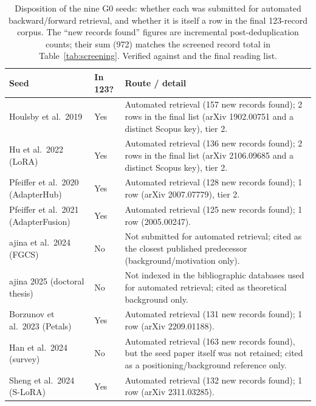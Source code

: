 \begin{table}[H]
\centering
\caption{Disposition of the nine G0 seeds: whether each was submitted for
automated backward/forward retrieval, and whether it is itself a row in the
final 123-record corpus. The ``new records found'' figures are incremental
post-deduplication counts; their sum (972) matches the screened record total in
Table~\ref{tab:screening}. Verified against \texttt{}
and the final reading list.}
\label{tab:g0_disposition}
\small
\setlength{\tabcolsep}{4pt}
\begin{tabular}{
  >{\raggedright\arraybackslash}p{}
  >{\raggedright\arraybackslash}p{}
  >{\raggedright\arraybackslash}p{}}
\toprule
\textbf{Seed} & \textbf{In 123?} & \textbf{Route / detail} \\
\midrule
Houlsby et al.\ 2019 & Yes & Automated retrieval (157 new records found); 2 rows in the final list (arXiv 1902.00751 and a distinct Scopus key), tier 2. \\
Hu et al.\ 2022 (LoRA) & Yes & Automated retrieval (136 new records found); 2 rows in the final list (arXiv 2106.09685 and a distinct Scopus key), tier 2. \\
Pfeiffer et al.\ 2020 (AdapterHub) & Yes & Automated retrieval (128 new records found); 1 row (arXiv 2007.07779), tier 2. \\
Pfeiffer et al.\ 2021 (AdapterFusion) & Yes & Automated retrieval (125 new records found); 1 row (2005.00247). \\
{\v{S}}ajina et al.\ 2024 (FGCS) & No & Not submitted for automated retrieval; cited as the closest published predecessor (background/motivation only). \\
{\v{S}}ajina 2025 (doctoral thesis) & No & Not indexed in the bibliographic databases used for automated retrieval; cited as theoretical background only. \\
Borzunov et al.\ 2023 (Petals) & Yes & Automated retrieval (131 new records found); 1 row (arXiv 2209.01188). \\
Han et al.\ 2024 (survey) & No & Automated retrieval (163 new records found), but the seed paper itself was not retained; cited as a positioning/background reference only. \\
Sheng et al.\ 2024 (S-LoRA) & Yes & Automated retrieval (132 new records found); 1 row (arXiv 2311.03285). \\
\bottomrule
\end{tabular}
\end{table}

